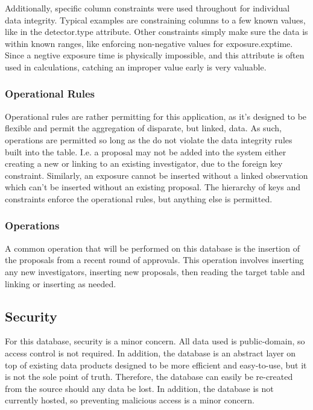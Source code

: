 \documentclass[a4paper,11pt]{article}
\begin{document}
Additionally, specific column constraints were used throughout for individual data integrity.  Typical examples are constraining columns to a few known values, like in the detector.type attribute.  Other constraints simply make sure the data is within known ranges, like enforcing non-negative values for exposure.exptime.  Since a negtive exposure time is physically impossible, and this attribute is often used in calculations, catching an improper value early is very valuable. 

\subsubsection{Operational Rules}
Operational rules are rather permitting for this application, as it's designed to be flexible and permit the aggregation of disparate, but linked, data.  As such, operations are permitted so long as the do not violate the data integrity rules built into the table.  I.e. a proposal may not be added into the system either creating a new or linking to an existing investigator, due to the foreign key constraint. Similarly, an exposure cannot be inserted without a linked observation which can't be inserted without an existing proposal.  The hierarchy of keys and constraints enforce the operational rules, but anything else is permitted. 

\subsubsection{Operations}
A common operation that will be performed on this database is the insertion of the proposals from a recent round of approvals.  This operation involves inserting any new investigators, inserting new proposals, then reading the target table and linking or inserting as needed.   

\subsection{Security}
For this database, security is a minor concern.  All data used is public-domain, so access control is not required.  In addition, the database is an abstract layer on top of existing data products designed to be more efficient and easy-to-use, but it is not the sole point of truth.  Therefore, the database can easily be re-created from the source should any data be lost.  In addition, the database is not currently hosted, so preventing malicious access is a minor concern.
\end{document}
